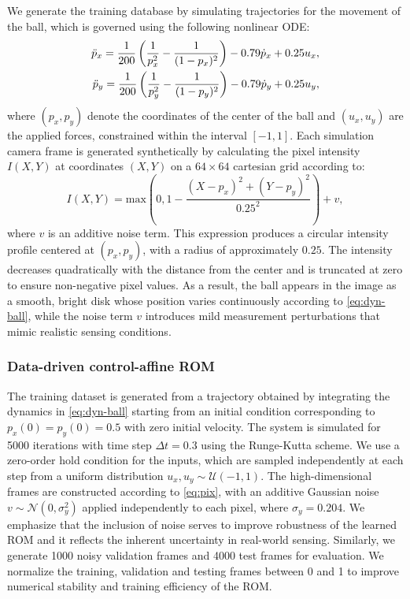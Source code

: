 \documentclass{article}
\begin{document}
We generate the training database by simulating trajectories for the movement of the ball, which is governed using the following nonlinear ODE:
\begin{subequations}\label{eq:dyn-ball}
\begin{align}
    \label{eq:dyn-ball-x}
    \Ddot{p}_x = \frac{1}{200}\left(\frac{1}{p_x^2}-\frac{1}{(1-p_x)^2}\right)-0.79\dot{p}_x + 0.25u_x, \\
    \label{eq:dyn-ball-y}
    \Ddot{p}_y = \frac{1}{200}\left(\frac{1}{p_y^2}-\frac{1}{(1-p_y)^2}\right)-0.79\dot{p}_y + 0.25u_y,
\end{align}
\end{subequations}
where $(p_x,p_y)$ denote the coordinates of the center of the ball and $(u_x,u_y)$ are the applied forces, constrained within the interval $[-1,1]$.
Each simulation camera frame is generated synthetically by calculating the pixel intensity $I(X,Y)$ at coordinates $(X,Y)$ on a $64\times 64$ cartesian grid according to:
\begin{equation}
    \label{eq:pix}
    I(X,Y) = \text{max}(0,1-\frac{(X-p_x)^2+(Y-p_y)^2}{0.25^2})+v,
\end{equation}
where $v$ is an additive noise term.
This expression produces a circular intensity profile centered at $(p_x,p_y)$, with a radius of approximately $0.25$.
The intensity decreases quadratically with the distance from the center and is truncated at zero to ensure non-negative pixel values.
As a result, the ball appears in the image as a smooth, bright disk whose position varies continuously according to \eqref{eq:dyn-ball}, while the noise term $v$ introduces mild measurement perturbations that mimic realistic sensing conditions.

\subsubsection{Data-driven control-affine ROM}
The training dataset is generated from a trajectory obtained by integrating the dynamics in \eqref{eq:dyn-ball} starting from an initial condition corresponding to $p_x(0)=p_y(0)=0.5$ with zero initial velocity.
The system is simulated for 5000 iterations with time step $\Delta t=0.3$ using the Runge-Kutta scheme.
We use a zero-order hold condition for the inputs, which are sampled independently at each step from a uniform distribution $u_x,u_y \sim \mathcal{U}(-1,1)$.
The high-dimensional frames are constructed according to \eqref{eq:pix}, with an additive Gaussian noise $v \sim \mathcal{N}(0,\sigma_y^2)$ applied independently to each pixel, where $\sigma_y=0.204$.
We emphasize that the inclusion of noise serves to improve robustness of the learned ROM and it reflects the inherent uncertainty in real-world sensing. 
Similarly, we generate 1000 noisy validation frames and 4000 test frames for evaluation.
We normalize the training, validation and testing frames between 0 and 1 to improve numerical stability and training efficiency of the ROM.
\end{document}
